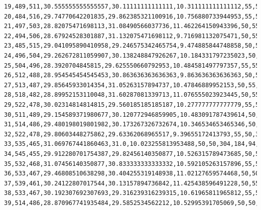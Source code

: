 \documentclass[authoryearcitations]{UoYCSproject}
\begin{document}
\begin{landscape}
\begin{verbatim}
19,489,511,30.555555555555557,30.11111111111111,10.311111111111112,55,55,317,183,91,59,58,57,54,34,35,30,28,26,8,10,7,1,1,1,0
20,484,516,29.74770642201835,29.862385321100916,10.756880733944953,55,50,317,168,99,67,55,50,50,50,33,29,22,27,13,9,5,5,1,0,0
21,497,503,28.82075471698113,31.08490566037736,11.462264150943396,50,55,303,180,88,82,56,51,53,35,39,30,22,19,24,9,5,2,2,0,0
22,494,506,28.67924528301887,31.132075471698112,9.716981132075471,50,55,293,199,78,65,75,46,44,47,31,33,30,15,21,13,6,2,1,1,0
23,485,515,29.041095890410958,29.246575342465754,9.474885844748858,50,50,304,177,106,55,56,63,48,42,29,33,28,17,15,16,8,3,0,0,0
24,496,504,29.262672811059907,30.138248847926267,10.184331797235023,50,55,300,185,100,71,49,60,57,35,30,28,25,19,13,13,9,6,0,0,0
25,504,496,28.3920704845815,29.625550660792953,10.484581497797357,55,55,313,183,93,75,52,49,51,47,32,25,16,25,12,15,8,3,1,0,0
26,512,488,28.954545454545453,30.863636363636363,9.863636363636363,50,50,307,190,100,63,66,42,46,48,37,26,22,16,16,9,9,2,1,0,0
27,513,487,29.85645933014354,31.05263157894737,10.47846889952153,50,55,291,196,103,72,49,57,40,46,38,24,30,16,14,10,7,6,0,1,0
28,518,482,28.89952153110048,31.60287081339713,11.076555023923445,50,55,287,192,100,73,61,46,60,31,39,31,23,25,12,9,4,6,1,0,0
29,522,478,30.02314814814815,29.560185185185187,10.277777777777779,55,55,298,185,82,73,75,52,46,55,22,32,27,16,15,9,7,4,2,0,0
30,511,489,29.154589371980677,30.120772946859905,10.483091787439614,50,55,295,171,102,57,69,68,50,33,51,22,28,17,13,10,8,4,2,0,0
31,514,486,29.480198019801982,30.173267326732674,10.346534653465346,50,55,279,192,87,68,51,71,61,43,34,40,19,21,10,13,5,3,3,0,0
32,522,478,29.80603448275862,29.63362068965517,9.39655172413793,55,50,320,159,96,62,59,50,60,55,29,37,24,19,13,5,6,4,2,0,0
33,535,465,31.069767441860463,31.0,10.023255813953488,50,50,304,184,94,64,53,57,45,54,42,24,32,18,13,5,4,6,1,0,0
34,545,455,29.912280701754387,29.82456140350877,10.526315789473685,50,50,320,175,91,66,54,52,47,48,37,37,20,18,16,10,4,4,1,0,0
35,532,468,31.07456140350877,30.833333333333332,10.592105263157896,55,50,317,198,82,53,64,53,45,40,39,34,29,12,14,10,6,3,1,0,0
36,533,467,29.46808510638298,30.404255319148938,11.02127659574468,50,50,332,181,95,60,52,54,40,46,34,28,31,14,11,12,8,0,2,0,0
37,539,461,30.24122807017544,30.13157894736842,11.425438596491228,50,55,328,183,94,70,48,50,45,36,44,29,29,15,11,7,8,2,1,0,0
38,533,467,30.192307692307693,29.316239316239315,10.61965811965812,55,55,332,178,113,52,61,48,32,47,30,39,20,20,12,6,7,2,1,0,0
39,514,486,28.870967741935484,29.5852534562212,10.52995391705069,50,50,312,196,84,88,45,61,39,32,38,28,36,13,15,8,3,2,0,0,0

\end{verbatim}
\end{landscape}
\end{document}
